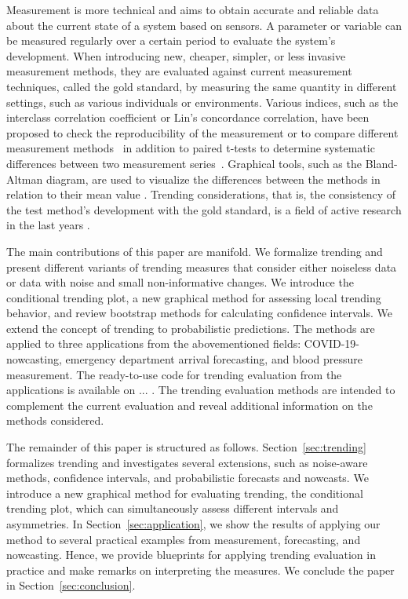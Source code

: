 Measurement is more technical and aims to obtain accurate and reliable data about the current state of a system based on sensors. 
A parameter or variable can be measured regularly over a certain period to evaluate the system's development.
When introducing new, cheaper, simpler, or less invasive measurement methods, they are evaluated against current measurement techniques, called the gold standard, by measuring the same quantity in different settings, such as various individuals or environments.
Various indices, such as the interclass correlation coefficient or Lin's concordance correlation, have been proposed to check the reproducibility of the measurement or to compare different measurement methods~\citep{lawrence1989concordance,koo2016guideline} in addition to paired t-tests to determine systematic differences between two measurement series~\citep{watson2010method}.
Graphical tools, such as the Bland-Altman diagram, are used to visualize the differences between the methods in relation to their mean value \citep{bland1986statistical}. 
Trending considerations, that is, the consistency of the test method's development with the gold standard, is a field of active research in the last years \citep{Saugel2015,saugel2018error,hiraishi2021concordance}. 

The main contributions of this paper are manifold.
We formalize trending and present different variants of trending measures that consider either noiseless data or data with noise and small non-informative changes.
We introduce the conditional trending plot, a new graphical method for assessing local trending behavior, and review bootstrap methods for calculating confidence intervals.
We extend the concept of trending to probabilistic predictions.
The methods are applied to three applications from the abovementioned fields: COVID-19-nowcasting, emergency department arrival forecasting, and blood pressure measurement.
The ready-to-use code for trending evaluation from the applications is available on ... .
The trending evaluation methods are intended to complement the current evaluation and reveal additional information on the methods considered.

The remainder of this paper is structured as follows.
Section~\ref{sec:trending} formalizes trending and investigates several extensions, such as noise-aware methods, confidence intervals, and probabilistic forecasts and nowcasts.
We introduce a new graphical method for evaluating trending, the conditional trending plot, which can simultaneously assess different intervals and asymmetries.
In Section~\ref{sec:application}, we show the results of applying our method to several practical examples from measurement, forecasting, and nowcasting.
Hence, we provide blueprints for applying trending evaluation in practice and make remarks on interpreting the measures.
We conclude the paper in Section~\ref{sec:conclusion}.

